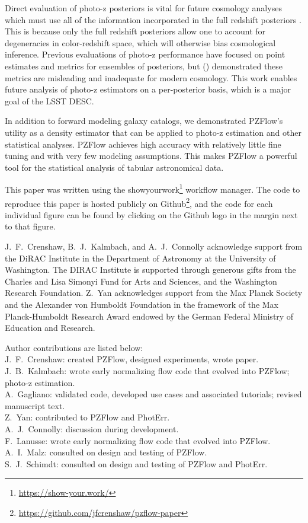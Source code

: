 \documentclass[twocolumn,twocolappendix]{aastex631}
\newcommand{\citePZt}{\citetalias{schmidt2020} (\citeyear{schmidt2020})\xspace}
\begin{document}
Direct evaluation of photo-z posteriors is vital for future cosmology analyses which must use all of the information incorporated in the full redshift posteriors \citep{newman2022}.
This is because only the full redshift posteriors allow one to account for degeneracies in color-redshift space, which will otherwise bias cosmological inference.
Previous evaluations of photo-z performance have focused on point estimates and metrics for ensembles of posteriors, but \citePZt demonstrated these metrics are misleading and inadequate for modern cosmology.
This work enables future analysis of photo-z estimators on a per-posterior basis, which is a major goal of the LSST DESC.

In addition to forward modeling galaxy catalogs, we demonstrated PZFlow's utility as a density estimator that can be applied to photo-z estimation and other statistical analyses.
PZFlow achieves high accuracy with relatively little fine tuning and with very few modeling assumptions.
This makes PZFlow a powerful tool for the statistical analysis of tabular astronomical data.

This paper was written using the showyourwork\footnote{\url{https://show-your.work/}} workflow manager.
The code to reproduce this paper is hosted publicly on Github\footnote{\url{https://github.com/jfcrenshaw/pzflow-paper}}, and the code for each individual figure can be found by clicking on the Github logo in the margin next to that figure.

\begin{acknowledgements}
    J.~F.~Crenshaw, B.~J.~Kalmbach, and A.~J.~Connolly acknowledge support from the DiRAC Institute in the Department of Astronomy at the University of Washington.
    The DIRAC Institute is supported through generous gifts from the Charles and Lisa Simonyi Fund for Arts and Sciences, and the Washington Research Foundation.
    Z.~Yan acknowledges support from the Max Planck Society and the Alexander von Humboldt Foundation in the framework of the Max Planck-Humboldt Research Award endowed by the German Federal Ministry of Education and Research.

    Author contributions are listed below: \\
    J.~F.~Crenshaw: created PZFlow, designed experiments, wrote paper. \\
    J.~B.~Kalmbach: wrote early normalizing flow code that evolved into PZFlow; photo-z estimation. \\
    A.~Gagliano: validated code, developed use cases and associated tutorials; revised manuscript text. \\
    Z.~Yan: contributed to PZFlow and PhotErr. \\
    A.~J.~Connolly: discussion during development. \\
    F.~Lanusse: wrote early normalizing flow code that evolved into PZFlow. \\
    A.~I.~Malz: consulted on design and testing of PZFlow. \\
    S.~J.~Schimdt: consulted on design and testing of PZFlow and PhotErr. \\
\end{acknowledgements}
\end{document}

